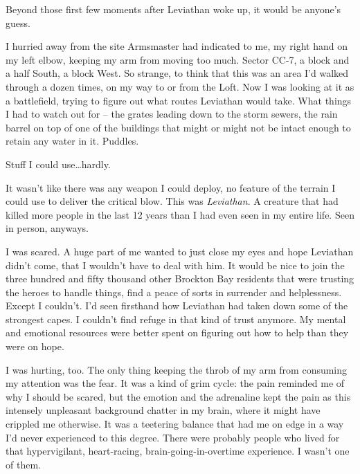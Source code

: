 Beyond those first few moments after Leviathan woke up, it would be anyone's guess.



I hurried away from the site Armsmaster had indicated to me, my right hand on my left elbow, keeping my arm from moving too much.  Sector CC-7, a block and a half South, a block West.  So strange, to think that this was an area I'd walked through a dozen times, on my way to or from the Loft.  Now I was looking at it as a battlefield, trying to figure out what routes Leviathan would take.  What things I had to watch out for – the grates leading down to the storm sewers, the rain barrel on top of one of the buildings that might or might not be intact enough to retain any water in it.  Puddles.



Stuff I could use\ldots  hardly.



It wasn't like there was any weapon I could deploy, no feature of the terrain I could use to deliver the critical blow.  This was \emph{Leviathan}.  A creature that had killed more people in the last 12 years than I had even seen in my entire life.  Seen in person, anyways.



I was scared.  A huge part of me wanted to just close my eyes and hope Leviathan didn't come, that I wouldn't have to deal with him.  It would be nice to join the three hundred and fifty thousand other Brockton Bay residents that were trusting the heroes to handle things, find a peace of sorts in surrender and helplessness.  Except I couldn't.  I'd seen firsthand how Leviathan had taken down some of the strongest capes.  I couldn't find refuge in that kind of trust anymore.  My mental and emotional resources were better spent on figuring out how to help than they were on hope.



I was hurting, too.  The only thing keeping the throb of my arm from consuming my attention was the fear.  It was a kind of grim cycle:  the pain reminded me of why I should be scared, but the emotion and the adrenaline kept the pain as this intensely unpleasant background chatter in my brain, where it might have crippled me otherwise.  It was a teetering balance that had me on edge in a way I'd never experienced to this degree.  There were probably people who lived for that hypervigilant, heart-racing, brain-going-in-overtime experience.  I wasn't one of them.




